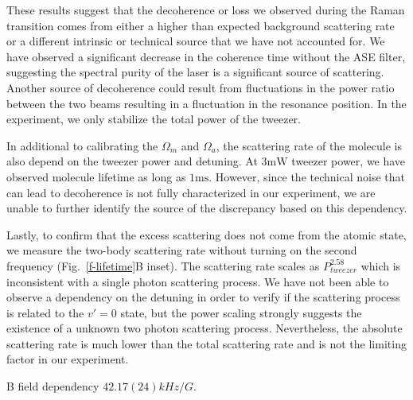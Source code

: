 \documentclass[aps,prl,twocolumn,superscriptaddress]{revtex4-1}
\newcommand{\todo}[1]{}
\begin{document}
\todo{change scattering to decoherence? since the fluctuation of light shift
  does not lead to scattering but only decherence.}
These results suggest that the decoherence or loss we observed during the Raman transition
comes from either a higher than expected background scattering rate
or a different intrinsic or technical source that we have not accounted for.
We have observed a significant decrease in the coherence time without the ASE filter,
suggesting the spectral purity of the laser is a significant source of scattering.
Another source of decoherence could result from fluctuations in the power ratio
between the two beams resulting in a fluctuation in the resonance position.
In the experiment, we only stabilize the total power of the tweezer.

In additional to calibrating the $\Omega_m$ and $\Omega_a$,
the scattering rate of the molecule is also depend on the tweezer power and detuning.
At $3\mathrm{mW}$ tweezer power, we have observed molecule lifetime as long as $1\mathrm{ms}$.
However, since the technical noise that can lead to decoherence
is not fully characterized in our experiment,
we are unable to further identify the source of the discrepancy based on this dependency.

Lastly, to confirm that the excess scattering does not come from the atomic state,
we measure the two-body scattering rate
without turning on the second frequency (Fig.~\ref{f-lifetime}B inset).
The scattering rate scales as $P_{tweezer}^{2.58}$ which is inconsistent
with a single photon scattering process.
We have not been able to observe a dependency on the detuning in order to verify
if the scattering process is related to the $v'=0$ state,
but the power scaling strongly suggests the existence of a unknown two photon scattering process.
Nevertheless, the absolute scattering rate is much lower than the total scattering rate
and is not the limiting factor in our experiment.

\todo{}B field dependency $42.17(24) kHz/G$.
\end{document}
